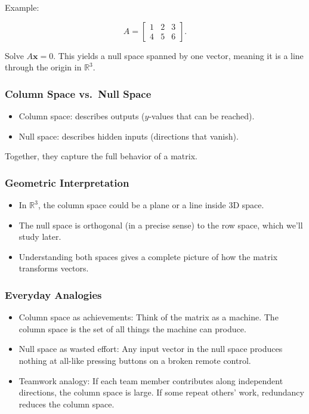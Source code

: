 \documentclass[
  letterpaper,
  DIV=11,
  numbers=noendperiod]{scrreprt}
\providecommand{\tightlist}{%
  \setlength{\itemsep}{0pt}\setlength{\parskip}{0pt}}
\begin{document}
Example:

\[
A = \begin{bmatrix}  
1 & 2 & 3 \\  
4 & 5 & 6  
\end{bmatrix}.
\]

Solve \(A\mathbf{x} = 0\). This yields a null space spanned by one
vector, meaning it is a line through the origin in \(\mathbb{R}^3\).

\subsubsection{Column Space vs.~Null
Space}\label{column-space-vs.-null-space}

\begin{itemize}
\tightlist
\item
  Column space: describes outputs (\(y\)-values that can be reached).
\item
  Null space: describes hidden inputs (directions that vanish).
\end{itemize}

Together, they capture the full behavior of a matrix.

\subsubsection{Geometric
Interpretation}\label{geometric-interpretation-3}

\begin{itemize}
\tightlist
\item
  In \(\mathbb{R}^3\), the column space could be a plane or a line
  inside 3D space.
\item
  The null space is orthogonal (in a precise sense) to the row space,
  which we'll study later.
\item
  Understanding both spaces gives a complete picture of how the matrix
  transforms vectors.
\end{itemize}

\subsubsection{Everyday Analogies}\label{everyday-analogies-28}

\begin{itemize}
\tightlist
\item
  Column space as achievements: Think of the matrix as a machine. The
  column space is the set of all things the machine can produce.
\item
  Null space as wasted effort: Any input vector in the null space
  produces nothing at all-like pressing buttons on a broken remote
  control.
\item
  Teamwork analogy: If each team member contributes along independent
  directions, the column space is large. If some repeat others' work,
  redundancy reduces the column space.
\end{itemize}
\end{document}
